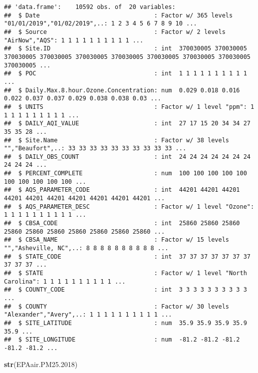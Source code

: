 \documentclass[]{article}
\newenvironment{Shaded}{\begin{snugshade}}{\end{snugshade}}
\newcommand{\FloatTok}[1]{\textcolor[rgb]{0.00,0.00,0.81}{#1}}
\newcommand{\KeywordTok}[1]{\textcolor[rgb]{0.13,0.29,0.53}{\textbf{#1}}}
\newcommand{\NormalTok}[1]{#1}
\begin{document}
\begin{verbatim}
## 'data.frame':    10592 obs. of  20 variables:
##  $ Date                                : Factor w/ 365 levels "01/01/2019","01/02/2019",..: 1 2 3 4 5 6 7 8 9 10 ...
##  $ Source                              : Factor w/ 2 levels "AirNow","AQS": 1 1 1 1 1 1 1 1 1 1 ...
##  $ Site.ID                             : int  370030005 370030005 370030005 370030005 370030005 370030005 370030005 370030005 370030005 370030005 ...
##  $ POC                                 : int  1 1 1 1 1 1 1 1 1 1 ...
##  $ Daily.Max.8.hour.Ozone.Concentration: num  0.029 0.018 0.016 0.022 0.037 0.037 0.029 0.038 0.038 0.03 ...
##  $ UNITS                               : Factor w/ 1 level "ppm": 1 1 1 1 1 1 1 1 1 1 ...
##  $ DAILY_AQI_VALUE                     : int  27 17 15 20 34 34 27 35 35 28 ...
##  $ Site.Name                           : Factor w/ 38 levels "","Beaufort",..: 33 33 33 33 33 33 33 33 33 33 ...
##  $ DAILY_OBS_COUNT                     : int  24 24 24 24 24 24 24 24 24 24 ...
##  $ PERCENT_COMPLETE                    : num  100 100 100 100 100 100 100 100 100 100 ...
##  $ AQS_PARAMETER_CODE                  : int  44201 44201 44201 44201 44201 44201 44201 44201 44201 44201 ...
##  $ AQS_PARAMETER_DESC                  : Factor w/ 1 level "Ozone": 1 1 1 1 1 1 1 1 1 1 ...
##  $ CBSA_CODE                           : int  25860 25860 25860 25860 25860 25860 25860 25860 25860 25860 ...
##  $ CBSA_NAME                           : Factor w/ 15 levels "","Asheville, NC",..: 8 8 8 8 8 8 8 8 8 8 ...
##  $ STATE_CODE                          : int  37 37 37 37 37 37 37 37 37 37 ...
##  $ STATE                               : Factor w/ 1 level "North Carolina": 1 1 1 1 1 1 1 1 1 1 ...
##  $ COUNTY_CODE                         : int  3 3 3 3 3 3 3 3 3 3 ...
##  $ COUNTY                              : Factor w/ 30 levels "Alexander","Avery",..: 1 1 1 1 1 1 1 1 1 1 ...
##  $ SITE_LATITUDE                       : num  35.9 35.9 35.9 35.9 35.9 ...
##  $ SITE_LONGITUDE                      : num  -81.2 -81.2 -81.2 -81.2 -81.2 ...
\end{verbatim}

\begin{Shaded}
\begin{Highlighting}[]
\KeywordTok{str}\NormalTok{(EPAair.PM25}\FloatTok{.2018}\NormalTok{)}
\end{Highlighting}
\end{Shaded}
\end{document}
